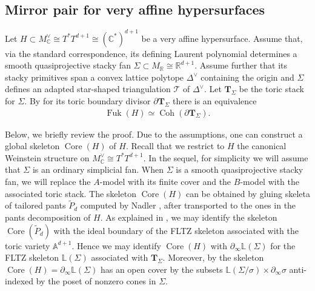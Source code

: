 \documentclass[a4paper,12pt, twoside, pdftex]{amsart}
\theoremstyle{definition}
\numberwithin{equation}{section}
\newcommand{\Coh}{\operatorname{Coh}}
\newcommand{\Core}{\operatorname{Core}}
\newcommand{\del}{\partial}
\newcommand{\Fuk}{\operatorname{Fuk}}
\newcommand{\cT}{\mathcal{T}}
\newcommand{\bA}{\mathbb{A}}
\newcommand{\bC}{\mathbb{C}}
\newcommand{\bL}{\mathbb{L}}
\newcommand{\bR}{\mathbb{R}}
\newcommand{\bfT}{\mathbf{T}}
\begin{document}
\subsection{Mirror pair for very affine hypersurfaces}
Let
$H
\subset
M^\vee_\bC
\cong
T^* T^{d+1}
\cong
(\bC^*)^{d+1}$
be a very affine hypersurface. 
Assume that,
via the standard correspondence,
its defining Laurent polynomial determines a smooth quasiprojective stacky fan
$\Sigma \subset M_\bR \cong \bR^{d+1}$.
Assume further that
its stacky primitives span a convex lattice polytope
$\Delta^\vee$
containing the origin
and
$\Sigma$
defines an adapted star-shaped triangulation
$\cT$
of
$\Delta^\vee$.
Let
$\bfT_\Sigma$
be the toric stack for
$\Sigma$.
By
\cite[Theorem 1.1]{GS2}
for its toric boundary divisor
$\del \bfT_\Sigma$
there is an equivalence
\begin{align} \label{eq:GS}
\Fuk(H) \simeq \Coh(\del \bfT_\Sigma).
\end{align}

Below,
we briefly review the proof.
Due to the assumptions,
one can construct a global skeleton
$\Core(H)$
of
$H$.
Recall that
we restrict to
$H$
the canonical Weinstein structure on
$M^\vee_\bC \cong T^* T^{d+1}$.  
In the sequel,
for simplicity we will assume that
$\Sigma$
is an ordinary simplicial fan.
When 
$\Sigma$
is a smooth quasiprojective stacky fan,
we will replace
the $A$-model with its finite cover
and
the $B$-model with the associated toric stack.
The skeleton
$\Core(H)$
can be obtained by gluing skeleta of tailored pants
$\tilde{P}_d$
computed by Nadler
\cite{Nad},
after transported to the ones in the pants decomposition of
$H$.
As explained in
\cite{Nad},
we may identify the skeleton
$\Core(\tilde{P}_d)$
with the ideal boundary of the FLTZ skeleton associated with the toric variety
$\bA^{d+1}$.
Hence we may identify
$\Core(H)$
with
$\del_\infty \bL(\Sigma)$
for the FLTZ skeleton
$\bL(\Sigma)$
associated with
$\bfT_\Sigma$.
Moreover,
by
\cite[Corollary 4.8]{GS2}
the skeleton
$\Core(H) = \del_\infty \bL(\Sigma)$
has an open cover by the subsets
$\bL(\Sigma / \sigma) \times \del_\infty \sigma$
anti-indexed by the poset of nonzero cones in
$\Sigma$.
\end{document}
